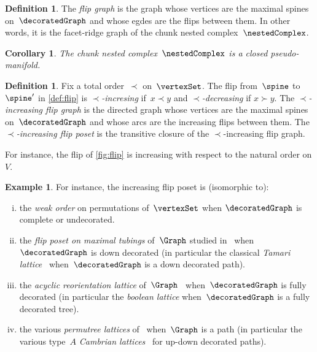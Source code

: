 \documentclass{amsart}
\newtheorem{corollary}[theorem]{Corollary}
\theoremstyle{definition}
\newtheorem{definition}[theorem]{Definition}
\newtheorem{example}[theorem]{Example}
\newcommand{\darkblue}{\color{darkblue}} %
\newcommand{\defn}[1]{\textsl{\darkblue #1}} %
\begin{document}
\begin{definition}
  \label{def:flipGraph}
  The \defn{flip graph} is the graph whose vertices are the maximal spines on~$\decoratedGraph$ and whose egdes are the flips between them.
  In other words, it is the facet-ridge graph of the chunk nested complex~$\nestedComplex$.
\end{definition}

\begin{corollary} 
   The chunk nested complex~$\nestedComplex$ is a closed pseudo-manifold. 
\end{corollary}
  
\begin{definition}
  \label{def:increasingFlip}
  Fix a total order~$\prec$ on~$\vertexSet$.
  The flip from~$\spine$ to~$\spine'$ in \cref{def:flip} is \defn{$\prec$-incresing} if~$x \prec y$ and \defn{$\prec$-decreasing} if $x \succ y$.
  The \defn{$\prec$-increasing flip graph} is the directed graph whose vertices are the maximal spines on~$\decoratedGraph$ and whose arcs are the increasing flips between them.
  The \defn{$\prec$-increasing flip poset} is the transitive closure of the $\prec$-increasing flip graph.
\end{definition}

For instance, the flip of \cref{fig:flip} is increasing with respect to the natural order on $V$.

\begin{example}
  \label{exm:flipPosets}
  For instance, the increasing flip poset is (isomorphic to):
  \begin{enumerate}[(i)]
    \item the \defn{weak order} on permutations of~$\vertexSet$ when $\decoratedGraph$ is complete or undecorated.
    \item the \defn{flip poset on maximal tubings} of~$\Graph$ studied in~\cite{BarnardMcConville} when~$\decoratedGraph$ is down decorated (in particular the classical \defn{Tamari lattice}~\cite{Tamari, HuangTamari} when~$\decoratedGraph$ is a down decorated path).
    \item the \defn{acyclic reorientation lattice} of~$\Graph$~\cite{Pilaud-acyclicReorientationLattices} when~$\decoratedGraph$ is fully decorated (in particular the \defn{boolean lattice} when~$\decoratedGraph$ is a fully decorated tree).
    \item the various \defn{permutree lattices} of~\cite{PilaudPons-permutrees} when~$\Graph$ is a path (in particular the various type~$A$ \defn{Cambrian lattices}~\cite{Reading-CambrianLattices} for up-down decorated paths).
  \end{enumerate}
\end{example}
\end{document}
